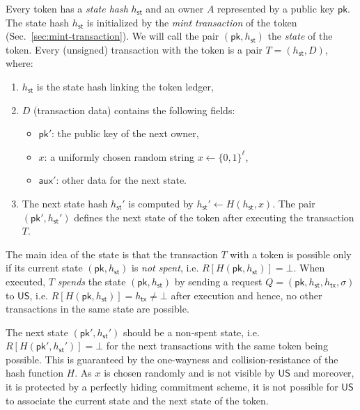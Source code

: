 \documentclass{article}
\newcommand{\pubkey}[0]{\mathsf{pk}}
\newcommand{\unisrv}[0]{\mathsf{US}}
\newcommand{\sthash}[0]{{h_\mathsf{st}}}
\newcommand{\txhash}[0]{{h_\mathsf{tx}}}
\newcommand{\auxd}[0]{\mathsf{aux}}
\begin{document}
Every token has a \emph{state hash} $\sthash$ and an owner $A$ represented by a public key $\pubkey$. The state hash $\sthash$ is initialized by the \emph{mint transaction} of the token (Sec.~\ref{sec:mint-transaction}).
We will call the pair $(\pubkey, \sthash)$ the \emph{state} of the token.
Every (unsigned) transaction with the token is a pair
$T = (\sthash, D)$, where:
\begin{enumerate}
\item $\sthash$ is the state hash linking the token ledger,
\item $D$ (transaction data) contains the following fields:
\begin{itemize}
\item $\pubkey'$: the public key of the next owner,
\item $x$: a uniformly chosen random string $x\gets\{0,1\}^\ell$,
\item $\auxd'$: other data for the next state.
\end{itemize}
\item The next state hash $\sthash'$ is computed by $\sthash'\gets H(\sthash,x)$. The pair $(\pubkey', \sthash')$ defines the next state of the token after executing the transaction $T$.
\end{enumerate}
The main idea of the state is that the transaction $T$ with a token is possible only if its current state $(\pubkey,\sthash)$ is \emph{not spent}, i.e. $R[H(\pubkey,\sthash)]=\bot$. When executed, $T$ \emph{spends} the state $(\pubkey,\sthash)$ by sending a request $Q=(\pubkey,\sthash,\txhash,\sigma)$ to $\unisrv$, i.e. $R[H(\pubkey,\sthash)]=\txhash\neq\bot$ after execution and hence, no other transactions in the same state are possible.

The next state $(\pubkey',\sthash')$ should be a non-spent state, i.e. $R[H(\pubkey',\sthash')]=\bot$ for the next transactions with the same token being possible. This is guaranteed by the one-wayness and collision-resistance of the hash function $H$. As $x$ is chosen randomly and is not visible by $\unisrv$ and moreover, it is protected by a perfectly hiding commitment scheme, it is not possible for $\unisrv$ to associate the current state and the next state of the token.
\medskip
\end{document}
